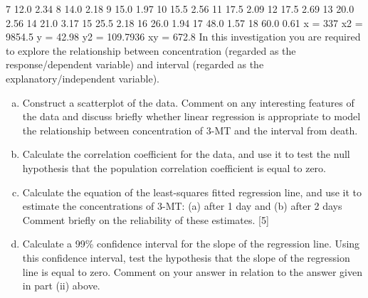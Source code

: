 \documentclass[a4paper,12pt]{article}
\begin{document}
\begin{enumerate}
7 12.0 2.34
8 14.0 2.18
9 15.0 1.97
10 15.5 2.56
11 17.5 2.09
12 17.5 2.69
13 20.0 2.56
14 21.0 3.17
15 25.5 2.18
16 26.0 1.94
17 48.0 1.57
18 60.0 0.61
x = 337 x2 = 9854.5 y = 42.98 y2 = 109.7936 xy = 672.8
In this investigation you are required to explore the relationship between
concentration (regarded as the response/dependent variable) and interval (regarded as the explanatory/independent variable).
\begin{enumerate}[(a)]
    \item  Construct a scatterplot of the data. Comment on any interesting features of the data and discuss briefly whether linear regression is appropriate to model the relationship between concentration of 3-MT and the interval from death.

    \item Calculate the correlation coefficient for the data, and use it to test the null
hypothesis that the population correlation coefficient is equal to zero.

    \item  Calculate the equation of the least-squares fitted regression line, and use it to
estimate the concentrations of 3-MT:
(a) after 1 day and
(b) after 2 days
Comment briefly on the reliability of these estimates. [5]
    \item Calculate a 99\% confidence interval for the slope of the regression line. Using this confidence interval, test the hypothesis that the slope of the regression line is equal to zero. Comment on your answer in relation to the answer given in
part (ii) above.
\end{enumerate}

\end{enumerate}
\newpage
\end{document}

